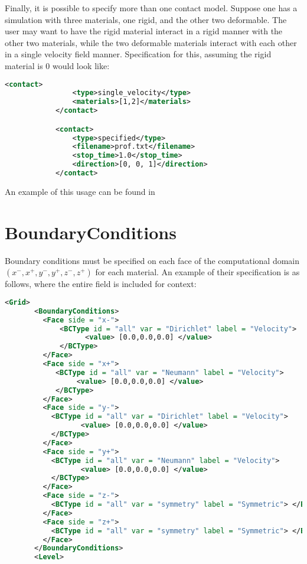 Finally, it is possible to specify more than one contact model.  Suppose
one has a simulation with three materials, one rigid, and the other two
deformable.  The user may want to have the rigid material interact in a
rigid manner with the other two materials, while the two deformable materials
interact with each other in a single velocity field manner.  Specification
for this, assuming the rigid material is $0$ would look like:

\begin{lstlisting}[language=XML]
            <contact>
                <type>single_velocity</type>
                <materials>[1,2]</materials>
            </contact>

            <contact>
                <type>specified</type>
                <filename>prof.txt</filename>
                <stop_time>1.0</stop_time>
                <direction>[0, 0, 1]</direction>
            </contact>
\end{lstlisting}
An example of this usage can be found in 

\section{BoundaryConditions} \label{Sec:MPM_BCs}

Boundary conditions must be specified on each face of the computational
domain $(x^-, x^+, y^-, y^+,z^-,z^+)$ for each material.  An example of their
specification is as follows, where the entire  field
is included for context:
\begin{lstlisting}[language=XML]
    <Grid>
       <BoundaryConditions>
         <Face side = "x-">
             <BCType id = "all" var = "Dirichlet" label = "Velocity">
                   <value> [0.0,0.0,0.0] </value>
             </BCType>
         </Face>
         <Face side = "x+">
            <BCType id = "all" var = "Neumann" label = "Velocity">
                 <value> [0.0,0.0,0.0] </value>
            </BCType>
         </Face>
         <Face side = "y-">
           <BCType id = "all" var = "Dirichlet" label = "Velocity">
                  <value> [0.0,0.0,0.0] </value>
           </BCType>
         </Face>
         <Face side = "y+">
           <BCType id = "all" var = "Neumann" label = "Velocity">
                  <value> [0.0,0.0,0.0] </value>
           </BCType>
         </Face>
         <Face side = "z-">
           <BCType id = "all" var = "symmetry" label = "Symmetric"> </BCType>
         </Face>
         <Face side = "z+">
           <BCType id = "all" var = "symmetry" label = "Symmetric"> </BCType>
         </Face>
       </BoundaryConditions>
       <Level>
\end{lstlisting}

